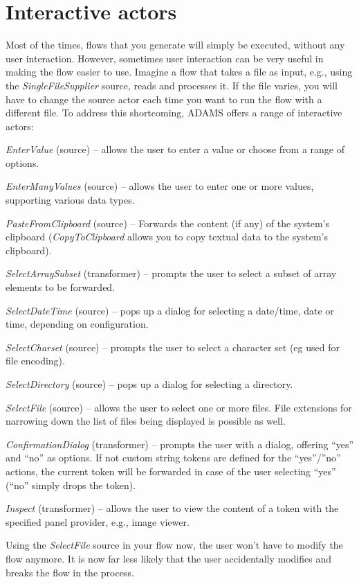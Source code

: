 \newpage
\section{Interactive actors}
\label{interactive_actors}
Most of the times, flows that you generate will simply be executed, without any
user interaction. However, sometimes user interaction can be very useful in
making the flow easier to use. Imagine a flow that takes a file as input, e.g.,
using the \textit{SingleFileSupplier} source, reads and processes it. If the
file varies, you will have to change the source actor each time you want to run
the flow with a different file. To address this shortcoming, ADAMS offers a
range of interactive actors:
\begin{tight_itemize}
	\item \textit{EnterValue} (source) -- allows the user to enter a value or
	choose from a range of options.
	\item \textit{EnterManyValues} (source) -- allows the user to enter one
	or more values, supporting various data types.
	\item \textit{PasteFromClipboard} (source) -- Forwards the content (if any) of
	the system's clipboard (\textit{CopyToClipboard} allows you to copy textual
	data to the system's clipboard).
	\item \textit{SelectArraySubset} (transformer) -- prompts the user to select
	a subset of array elements to be forwarded.
	\item \textit{SelectDateTime} (source) -- pops up a dialog for selecting a
	date/time, date or time, depending on configuration.
	\item \textit{SelectCharset} (source) -- prompts the user to select a
	character set (eg used for file encoding).
	\item \textit{SelectDirectory} (source) -- pops up a dialog for selecting a
	directory.
	\item \textit{SelectFile} (source) -- allows the user to select one or more
	files. File extensions for narrowing down the list of files being displayed is
	possible as well.
	\item \textit{ConfirmationDialog} (transformer) -- prompts the user with a
	dialog, offering ``yes'' and ``no'' as options. If not custom string tokens are
	defined for the ``yes''/''no'' actions, the current token will be forwarded in
	case of the user selecting ``yes'' (``no'' simply drops the token).
	\item \textit{Inspect} (transformer) -- allows the user to view the content
	of a token with the specified panel provider, e.g., image viewer.
\end{tight_itemize}
Using the \textit{SelectFile} source in your flow now, the user won't have to
modify the flow anymore. It is now far less likely that the user accidentally
modifies and breaks the flow in the process.

